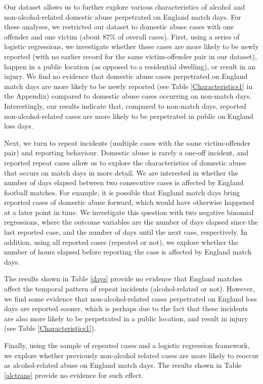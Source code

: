 \documentclass[12pt, a4paper]{article}
\begin{document}
Our dataset allows us to further explore various characteristics of alcohol and non-alcohol-related domestic abuse perpetrated on England match days. For these analyses, we restricted our dataset to domestic abuse cases with one offender and one victim (about 87\% of overall cases). First, using a series of logistic regressions, we investigate whether these cases are more likely to be newly reported (with no earlier record for the same victim-offender pair in our dataset), happen in a public location (as opposed to a residential dwelling), or result in an injury. We find no evidence that domestic abuse cases perpetrated on England match days are more likely to be newly reported (see Table \ref{Characteristics1} in the Appendix) compared to domestic abuse cases occurring on non-match days. Interestingly, our results indicate that, compared to non-match days, reported non-alcohol-related cases are more likely to be perpetrated in public on England loss days. 

Next, we turn to repeat incidents (multiple cases with the same victim-offender pair) and reporting behaviour. Domestic abuse is rarely a one-off incident, and reported repeat cases allow us to explore the characteristics of domestic abuse that occurs on match days in more detail. We are interested in whether the number of days elapsed between two consecutive cases is affected by England football matches. For example, it is possible that England match days bring reported cases of domestic abuse forward, which would have otherwise happened at a later point in time. We investigate this question with two negative binomial regressions, where the outcome variables are the number of days elapsed since the last reported case, and the number of days until the next case, respectively. In addition, using all reported cases (repeated or not), we explore whether the number of hours elapsed before reporting the case is affected by England match days.


The results shown in Table \ref{days} provide no evidence that England matches affect the temporal pattern of repeat incidents (alcohol-related or not). However, we find some evidence that non-alcohol-related cases perpetrated on England loss days are reported sooner, which is perhaps due to the fact that these incidents are also more likely to be perpetrated in a public location, and result in injury (see Table \ref{Characteristics1}).



Finally, using the sample of repeated cases and a logistic regression framework, we explore whether previously non-alcohol related cases are more likely to reoccur as alcohol-related abuse on England match days. The results shown in Table \ref{alctrans} provide no evidence for such effect. 
\end{document}
